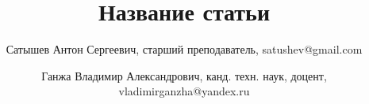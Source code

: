 \newcommand{\mainAuthor}{Сатышев Антон Сергеевич}
\newcommand{\articleTitle}{Название статьи}
\newcommand{\keywords}{Ключевые слова}


\author{\mainAuthor, старший преподаватель, satushev@gmail.com}
\author{Ганжа Владимир Александрович, канд. техн. наук, доцент, vladimirganzha@yandex.ru}


\title{\articleTitle}
\date{}